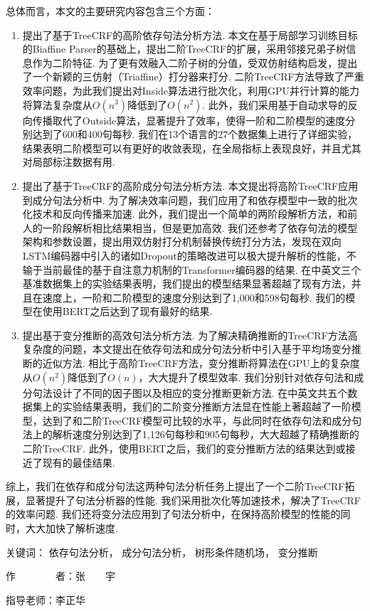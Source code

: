 \begin{cabstract}
  总体而言，本文的主要研究内容包含三个方面：
  \begin{enumerate}
    \item 提出了基于TreeCRF的高阶依存句法分析方法.
          本文在基于局部学习训练目标的Biaffine Parser的基础上，提出二阶TreeCRF的扩展，采用邻接兄弟子树信息作为二阶特征.
          为了更有效融入二阶子树的分值，受双仿射结构启发，提出了一个新颖的三仿射（Triaffine）打分器来打分.
          二阶TreeCRF方法导致了严重效率问题，为此我们提出对Inside算法进行批次化，利用GPU并行计算的能力将算法复杂度从$O(n^3)$降低到了$O(n^2)$.
          此外，我们采用基于自动求导的反向传播取代了Outside算法，显著提升了效率，使得一阶和二阶模型的速度分别达到了600和400句每秒.
          我们在13个语言的27个数据集上进行了详细实验，结果表明二阶模型可以有更好的收敛表现，在全局指标上表现良好，并且尤其对局部标注数据有用.
    \item 提出了基于TreeCRF的高阶成分句法分析方法.
          本文提出将高阶TreeCRF应用到成分句法分析中.
          为了解决效率问题，我们应用了和依存模型中一致的批次化技术和反向传播来加速.
          此外，我们提出一个简单的两阶段解析方法，和前人的一阶段解析相比结果相当，但是更加高效.
          我们还参考了依存句法的模型架构和参数设置，提出用双仿射打分机制替换传统打分方法，发现在双向LSTM编码器中引入的诸如Dropout的策略改进可以极大提升解析的性能，不输于当前最佳的基于自注意力机制的Transformer编码器的结果.
          在中英文三个基准数据集上的实验结果表明，我们提出的模型结果显著超越了现有方法，并且在速度上，一阶和二阶模型的速度分别达到了1,000和598句每秒.
          我们的模型在使用BERT之后达到了现有最好的结果.
    \item 提出基于变分推断的高效句法分析方法.
          为了解决精确推断的TreeCRF方法高复杂度的问题，本文提出在依存句法和成分句法分析中引入基于平均场变分推断的近似方法.
          相比于高阶TreeCRF方法，变分推断将算法在GPU上的复杂度从$O(n^2)$降低到了$O(n)$，大大提升了模型效率.
          我们分别针对依存句法和成分句法设计了不同的因子图以及相应的变分推断更新方法.
          在中英文共五个数据集上的实验结果表明，我们的二阶变分推断方法显在性能上著超越了一阶模型，达到了和二阶TreeCRF模型可比较的水平，与此同时在依存句法和成分句法上的解析速度分别达到了1,126句每秒和905句每秒，大大超越了精确推断的二阶TreeCRF.
          此外，使用BERT之后，我们的变分推断方法的结果达到或接近了现有的最佳结果.
  \end{enumerate}

  综上，我们在依存和成分句法这两种句法分析任务上提出了一个二阶TreeCRF拓展，显著提升了句法分析器的性能.
  我们采用批次化等加速技术，解决了TreeCRF的效率问题.
  我们还将变分法应用到了句法分析中，在保持高阶模型的性能的同时，大大加快了解析速度.

  \vskip 21bp
    {\heiti{} 关键词：}
  依存句法分析，
  成分句法分析，
  树形条件随机场，
  变分推断

  \begin{flushright}
    作~~~~~~~~者：张~~~~宇

    指导老师：李正华

  \end{flushright}
\end{cabstract}


